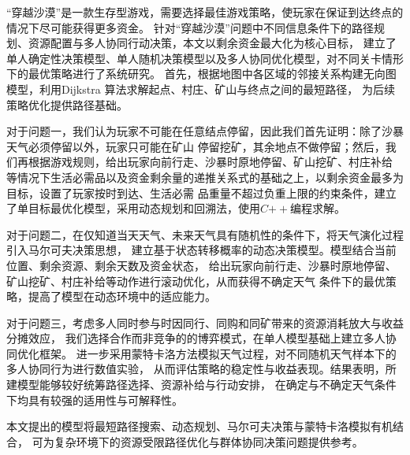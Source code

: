 “穿越沙漠”是一款生存型游戏，需要选择最佳游戏策略，使玩家在保证到达终点的情况下尽可能获得更多资金。
%
针对“穿越沙漠”问题中不同信息条件下的路径规划、资源配置与多人协同行动决策，本文以剩余资金最大化为核心目标，
%
建立了单人确定性决策模型、单人随机决策模型以及多人协同优化模型，对不同关卡情形下的最优策略进行了系统研究。
%
首先，根据地图中各区域的邻接关系构建无向图模型，利用Dijkstra 算法求解起点、村庄、矿山与终点之间的最短路径，
%
为后续策略优化提供路径基础。

对于问题一，我们认为玩家不可能在任意结点停留，因此我们首先证明：除了沙暴天气必须停留以外，玩家只可能在矿山
%
停留挖矿，其余地点不做停留；然后，我们再根据游戏规则，给出玩家向前行走、沙暴时原地停留、矿山挖矿、村庄补给
%
等情况下生活必需品以及资金剩余量的递推关系式的基础之上，以剩余资金最多为目标，设置了玩家按时到达、生活必需
%
品重量不超过负重上限的约束条件，建立了单目标最优化模型，采用动态规划和回溯法，使用$C\mathbin{++}$编程求解。

对于问题二，在仅知道当天天气、未来天气具有随机性的条件下，将天气演化过程引入马尔可夫决策思想，
%
建立基于状态转移概率的动态决策模型。模型结合当前位置、剩余资源、剩余天数及资金状态，
%
给出玩家向前行走、沙暴时原地停留、矿山挖矿、村庄补给等动作进行滚动优化，从而获得不确定天气
%
条件下的最优策略，提高了模型在动态环境中的适应能力。

对于问题三，考虑多人同时参与时因同行、同购和同矿带来的资源消耗放大与收益分摊效应，
%
我们选择合作而非竞争的的博弈模式，在单人模型基础上建立多人协同优化框架。
%
进一步采用蒙特卡洛方法模拟天气过程，对不同随机天气样本下的多人协同行为进行数值实验，
%
从而评估策略的稳定性与收益表现。结果表明，所建模型能够较好统筹路径选择、资源补给与行动安排，
%
在确定与不确定天气条件下均具有较强的适用性与可解释性。

本文提出的模型将最短路径搜索、动态规划、马尔可夫决策与蒙特卡洛模拟有机结合，
%
可为复杂环境下的资源受限路径优化与群体协同决策问题提供参考。